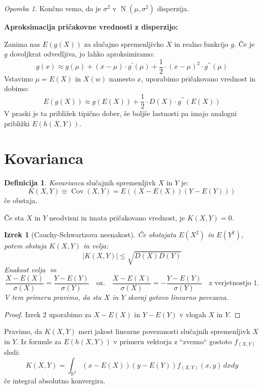 \documentclass[12pt]{book}
\def\n{\noindent}
\def\s{\vspace{10pt}}
\theoremstyle{definition}
\newtheorem{definicija}{Definicija}
\theoremstyle{plain}
\newtheorem{izrek}{Izrek}
\theoremstyle{plain}
\theoremstyle{plain}
\theoremstyle{plain}
\theoremstyle{remark}
\newtheorem*{opomba}{Opomba}
\begin{document}
\begin{opomba}
    Končno vemo, da je $\sigma^2$ v $\operatorname{N}\left(\mu, \sigma^2\right)$ disperzija. 
\end{opomba}

\s

\n \textbf{Aproksimacija pričakovne vrednosti z disperzijo:}

\n Zanima nas $E(g(X))$ za slučajno spremenljivko $X$ in realno funkcijo $g$. Če je $g$ dovoljkrat odvedljiva, jo lahko aproksimiramo:
$$
g(x) \approx g(\mu)+(x-\mu) \cdot g^{\prime}(\mu)+\frac{1}{2} \cdot(x-\mu)^2 \cdot g^{\prime \prime}(\mu)
$$
Vstavimo $\mu=E(X)$ in $X(w)$ namesto $x$, uporabimo pričakovano vrednost in dobimo: 
$$
E(g(X)) \approx g(E(X))+\frac{1}{2} \cdot D(X) \cdot g^{\prime \prime}(E(X))
$$
V praski je ta približek tipično dober, še boljše lastnosti pa imajo analogni približki $E(h(X,Y))$.

\section{Kovarianca}

\begin{definicija}
    \emph{Kovarianca} slučajnih spremenljivk $X$ in $Y$ je:
    $$
    K(X, Y)\equiv\operatorname{Cov}(X, Y)=E((X-E (X))(Y-E (Y)))
    $$
    če obstaja. 
\end{definicija}

\n Če sta $X$ in $Y$ neodvisni in imata pričakovano vrednost, je $K(X,Y) = 0$.

\begin{izrek}[Cauchy-Schwartzova neenakost]
    Če obstajata $E\left(X^2\right)$ in $E\left(Y^2\right)$, potem obstaja $K(X,Y)$ in velja: 
    $$
    |K(X, Y)| \leq \sqrt{D(X) D(Y)}
    $$
    Enakost velja $\iff$
    $$
    \frac{X-E(X)}{\sigma(X)}=\frac{Y-E(Y)}{\sigma(Y)} \quad \text{oz.} \quad \frac{X-E(X)}{\sigma(X)}=-\frac{Y-E(Y)}{\sigma(Y)} \quad \text{z verjetnostjo 1.}
    $$
    V tem primeru pravimo, da sta $X$ in $Y$ skoraj gotovo linearno povezana. 
\end{izrek}

\begin{proof}
    Izrek 2 uporabimo za $X-E(X)$ in $Y-E(Y)$ v vlogah $X$ in $Y$. 
\end{proof}

\n Pravimo, da $K(X,Y)$ meri jakost linearne povezanosti slučajnih spremenljivk $X$ in $Y$. Iz formule za $E(h(X,Y))$ v primeru vektorja z “zvezno“ gostoto $f_{(X,Y)}$ sledi: 
$$
K(X, Y)=\int_{\mathbb{R}^2}(x-E(X))(y-E(Y)) f_{(X, Y)}(x, y) \,d x d y
$$
če integral absolutno konvergira. 
\end{document}
